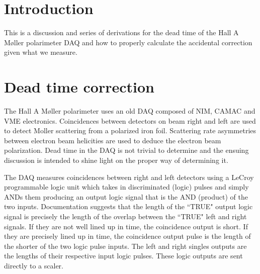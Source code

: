 \documentclass[12pt]{article}
\begin{document}
\maketitle

\section{Introduction}
This is a discussion and series of derivations for the dead time of the Hall A M\o ller polarimeter DAQ and how to properly calculate the accidental correction given what we measure.

\section{Dead time correction\label{sec:deadtime}}
The Hall A M\o ller polarimeter uses an old DAQ composed of NIM, CAMAC and VME electronics. Coincidences between detectors on beam right and left are used to detect Moller scattering from a polarized iron foil. Scattering rate asymmetries between electron beam helicities are used to deduce the electron beam polarization. Dead time in the DAQ is not trivial to determine and the ensuing discussion is intended to shine light on the proper way of determining it. 

The DAQ measures coincidences between right and left detectors using a LeCroy programmable logic unit which takes in discriminated (logic) pulses and simply ANDs them producing an output logic signal that is the AND (product) of the two inputs. Documentation suggests that the length of the ``TRUE" output logic signal is precisely the length of the overlap between the ``TRUE" left and right signals. If they are not well lined up in time, the coincidence output is short. If they are precisely lined up in time, the coincidence output pulse is the length of the shorter of the two logic pulse inputs. The left and right singles outputs are the lengths of their respective input logic pulses. These logic outputs are sent directly to a scaler.
\end{document}
